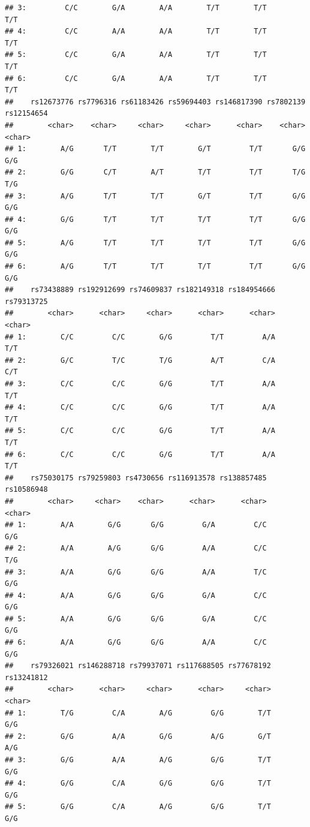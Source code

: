 \documentclass[
]{article}
\begin{document}
\begin{verbatim}
## 3:         C/C        G/A        A/A        T/T        T/T        T/T
## 4:         C/C        A/A        A/A        T/T        T/T        T/T
## 5:         C/C        G/A        A/A        T/T        T/T        T/T
## 6:         C/C        G/A        A/A        T/T        T/T        T/T
##    rs12673776 rs7796316 rs61183426 rs59694403 rs146817390 rs7802139 rs12154654
##        <char>    <char>     <char>     <char>      <char>    <char>     <char>
## 1:        A/G       T/T        T/T        G/T         T/T       G/G        G/G
## 2:        G/G       C/T        A/T        T/T         T/T       T/G        T/G
## 3:        A/G       T/T        T/T        G/T         T/T       G/G        G/G
## 4:        G/G       T/T        T/T        T/T         T/T       G/G        G/G
## 5:        A/G       T/T        T/T        T/T         T/T       G/G        G/G
## 6:        A/G       T/T        T/T        T/T         T/T       G/G        G/G
##    rs73438889 rs192912699 rs74609837 rs182149318 rs184954666 rs79313725
##        <char>      <char>     <char>      <char>      <char>     <char>
## 1:        C/C         C/C        G/G         T/T         A/A        T/T
## 2:        G/C         T/C        T/G         A/T         C/A        C/T
## 3:        C/C         C/C        G/G         T/T         A/A        T/T
## 4:        C/C         C/C        G/G         T/T         A/A        T/T
## 5:        C/C         C/C        G/G         T/T         A/A        T/T
## 6:        C/C         C/C        G/G         T/T         A/A        T/T
##    rs75030175 rs79259803 rs4730656 rs116913578 rs138857485 rs10586948
##        <char>     <char>    <char>      <char>      <char>     <char>
## 1:        A/A        G/G       G/G         G/A         C/C        G/G
## 2:        A/A        A/G       G/G         A/A         C/C        T/G
## 3:        A/A        G/G       G/G         A/A         T/C        G/G
## 4:        A/A        G/G       G/G         G/A         C/C        G/G
## 5:        A/A        G/G       G/G         G/A         C/C        G/G
## 6:        A/A        G/G       G/G         A/A         C/C        G/G
##    rs79326021 rs146288718 rs79937071 rs117688505 rs77678192 rs13241812
##        <char>      <char>     <char>      <char>     <char>     <char>
## 1:        T/G         C/A        A/G         G/G        T/T        G/G
## 2:        G/G         A/A        G/G         A/G        G/T        A/G
## 3:        G/G         A/A        A/G         G/G        T/T        G/G
## 4:        G/G         C/A        G/G         G/G        T/T        G/G
## 5:        G/G         C/A        A/G         G/G        T/T        G/G

\end{verbatim}
\end{document}
